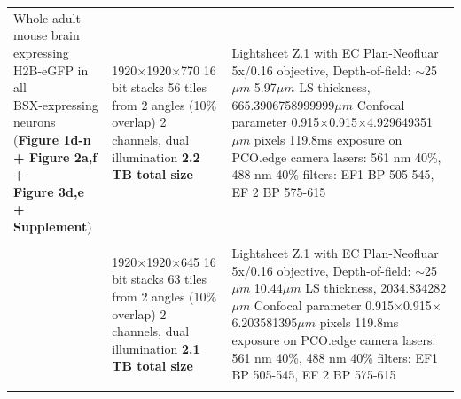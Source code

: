 \documentclass[]{spie}  %
\begin{document}
\begin{landscape}
{\begin{longtable}{lll}
                                         \multirowcell{2}[-4ex][l]{Whole adult mouse brain \\expressing H2B-eGFP in all \\BSX-expressing neurons\\(\textbf{Figure 1d-n + Figure 2a,f +}\\ \textbf{Figure 3d,e + Supplement})} &             \makecell[l]{1920$\times$1920$\times$770 16 bit stacks\\56 tiles from 2 angles (10\% overlap) \\2 channels, dual illumination\\\textbf{2.2 TB total size}}  &                                                               \makecell[l]{Lightsheet Z.1 with EC Plan-Neofluar 5x/0.16 objective, Depth-of-field: $\sim$25$\mu{}m$ \\5.97$\mu{}m$ LS thickness, 665.3906758999999$\mu{}m$ Confocal parameter\\0.915$\times$0.915$\times$4.929649351$\mu{}m$ pixels\\119.8ms exposure on PCO.edge camera\\lasers: 561 nm 40\%, 488 nm 40\%\\filters: EF1 BP 505-545, EF 2 BP 575-615} \\ \\
                                                                                                                                   
         &    \makecell[l]{1920$\times$1920$\times$645 16 bit stacks\\63 tiles from 2 angles (10\% overlap) \\2 channels, dual illumination\\\textbf{2.1 TB total size}}  &                                                                    \makecell[l]{Lightsheet Z.1 with EC Plan-Neofluar 5x/0.16 objective, Depth-of-field: $\sim$25$\mu{}m$ \\10.44$\mu{}m$ LS thickness, 2034.834282$\mu{}m$ Confocal parameter\\0.915$\times$0.915$\times$6.203581395$\mu{}m$ pixels\\119.8ms exposure on PCO.edge camera\\lasers: 561 nm 40\%, 488 nm 40\%\\filters: EF1 BP 505-545, EF 2 BP 575-615} \\ \\


\end{longtable}}
\end{landscape}
\end{document}
